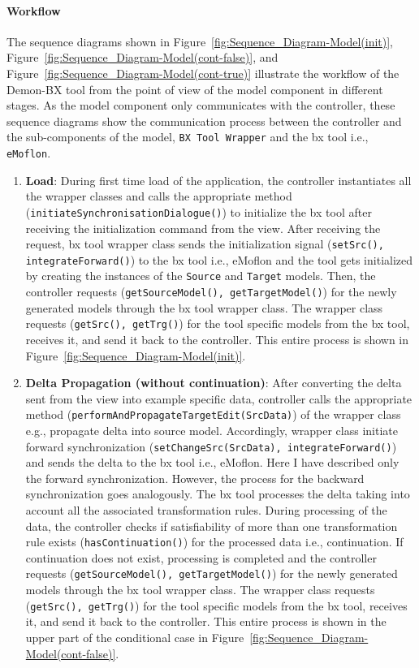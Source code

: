 \paragraph{Workflow}
The sequence diagrams shown in Figure~\ref{fig:Sequence_Diagram-Model(init)}, Figure~\ref{fig:Sequence_Diagram-Model(cont-false)}, and Figure~\ref{fig:Sequence_Diagram-Model(cont-true)} illustrate the workflow of the Demon-BX tool from the point of view of the model component in different stages. As the model component only communicates with the controller, these sequence diagrams show the communication process between the controller and the sub-components of the model, \texttt{BX Tool Wrapper} and the bx tool i.e., \texttt{eMoflon}.
\begin{enumerate}
	\item {\textbf{Load}: During first time load of the application, the controller instantiates all the wrapper classes and calls the appropriate method (\texttt{initiateSynchronisationDialogue()}) to initialize the bx tool after receiving the initialization command from the view. After receiving the request, bx tool wrapper class sends the initialization signal (\texttt{setSrc(), integrateForward()}) to the bx tool i.e., eMoflon and the tool gets initialized by creating the instances of the \texttt{Source} and \texttt{Target} models. Then, the controller requests (\texttt{getSourceModel(), getTargetModel()}) for the newly generated models through the bx tool wrapper class. The wrapper class requests (\texttt{getSrc(), getTrg()}) for the tool specific models from the bx tool, receives it, and send it back to the controller. This entire process is shown in Figure~\ref{fig:Sequence_Diagram-Model(init)}.}
	
	\item {\textbf{Delta Propagation (without continuation)}: After converting the delta sent from the view into example specific data, controller calls the appropriate method (\texttt{performAndPropagateTargetEdit(SrcData)}) of the wrapper class e.g., propagate delta into source model. Accordingly, wrapper class initiate forward synchronization (\texttt{setChangeSrc(SrcData), integrateForward()}) and sends the delta to the bx tool i.e., eMoflon. Here I have described only the forward synchronization. However, the process for the backward synchronization goes analogously. The bx tool processes the delta taking into account all the associated transformation rules. During processing of the data, the controller checks if satisfiability of more than one transformation rule exists (\texttt{hasContinuation()}) for the processed data i.e., continuation. If continuation does not exist, processing is completed and the controller requests (\texttt{getSourceModel(), getTargetModel()}) for the newly generated models through the bx tool wrapper class. The wrapper class requests (\texttt{getSrc(), getTrg()}) for the tool specific models from the bx tool, receives it, and send it back to the controller. This entire process is shown in the upper part of the conditional case in Figure~\ref{fig:Sequence_Diagram-Model(cont-false)}.}
	

\end{enumerate}
